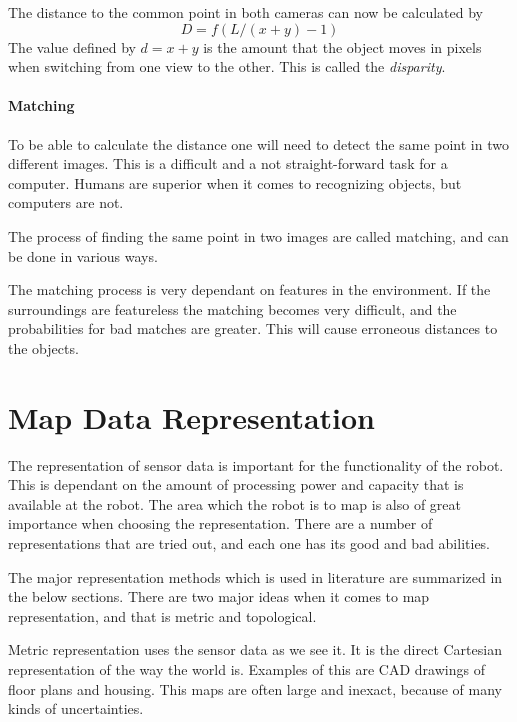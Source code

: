    

    The distance to the common point in both cameras can now be calculated by 
    \begin{equation}
        D = f (L / (x+y) - 1)
    \end{equation}
    The value defined by $d = x+y$ is the amount that the object moves in pixels when
    switching from one view to the other. This is called the \emph{disparity}.


\paragraph{Matching}
    To be able to calculate the distance one will need to detect the same point in two
    different images. This is a difficult and a not straight-forward task for a computer.
    Humans are superior when it comes to recognizing objects, but computers are not.

    The process of finding the same point in two images are called matching, and can be
    done in various ways. \cite{gonzalez}

    The matching process is very dependant on features in the environment. If the
    surroundings are featureless the matching becomes very difficult, and the
    probabilities for bad matches are greater. This will cause erroneous distances to the
    objects.






\section{Map Data Representation}
The representation of sensor data is important for the functionality of the robot. This is
dependant on the amount of processing power and capacity that is available at the robot.
The area which the robot is to map is also of great importance when choosing the
representation. There are a number of representations that are tried out, and each one has its good and
bad abilities. 

The major representation methods which is used in literature are summarized in the below
sections. There are two major ideas when it comes to map representation, and that is
metric and topological.

Metric representation uses the sensor data as we see it. It is the direct Cartesian
representation of the way the world is. Examples of this are CAD drawings of floor plans
and housing. This maps are often large and inexact, because of many kinds of
uncertainties.

